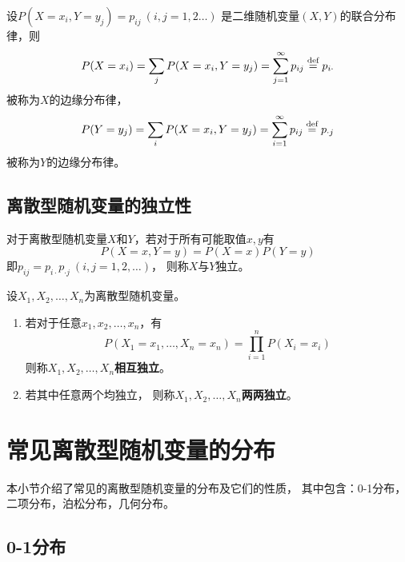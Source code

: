 \begin{definition}
  设$P(X=x_i,Y=y_j)=p_{ij}\ (i,j=1,2\dots)$
  是二维随机变量$(X,Y)$的联合分布律，则
  \begin{displaymath}
    P(X=x_i) = \sum_{j} P(X=x_i,Y=y_j) = \sum_{j=1}^{\infty}p_{ij}
    \overset{\text{def}}{=} p_{i\cdot}
  \end{displaymath}
  被称为$X$的边缘分布律，
  \begin{displaymath}
    P(Y=y_j) = \sum_{i} P(X=x_i,Y=y_j) = \sum_{i=1}^{\infty}p_{ij}
    \overset{\text{def}}{=} p_{\cdot j}
  \end{displaymath}
  被称为$Y$的边缘分布律。
\end{definition}

\subsection{离散型随机变量的独立性}
\begin{definition}[两个离散型随机变量的独立性]
  对于离散型随机变量$X$和$Y$，若对于所有可能取值$x,y$有
  \begin{displaymath}
    P(X=x,Y=y)=P(X=x)P(Y=y)
  \end{displaymath}
  即$p_{ij}=p_{i\cdot}p_{\cdot j}\ (i,j=1,2,\dots)$，
  则称$X$与$Y$独立。
\end{definition}

\begin{definition}[多离散型随机变量的独立性]
  设$X_1,X_2,\dots,X_n$为离散型随机变量。
  \begin{enumerate}
    \item
    若对于任意$x_1,x_2,\dots,x_n$，有
    \begin{displaymath}
      P(X_1=x_1,\dots,X_n=x_n)=\prod_{i=1}^{n}P(X_i=x_i)
    \end{displaymath}
    则称$X_1,X_2,\dots,X_n$\textbf{相互独立}。
    \item
    若其中任意两个均独立，
    则称$X_1,X_2,\dots,X_n$\textbf{两两独立}。
  \end{enumerate}
\end{definition}

\section{常见离散型随机变量的分布}
本小节介绍了常见的离散型随机变量的分布及它们的性质，
其中包含：0-1分布，二项分布，泊松分布，几何分布。

\subsection{0-1分布}

